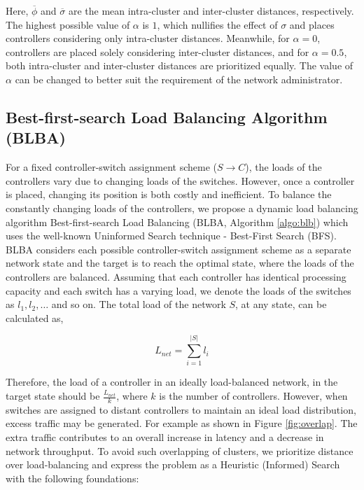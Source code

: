 \documentclass[final,5p,times]{cas-dc}
\begin{document}
	Here, $\overline{\phi}$ and $\overline{\sigma}$ are the  mean intra-cluster and inter-cluster distances, respectively. The highest possible value of $\alpha$ is $1$, which nullifies the effect of $\sigma$ and places controllers considering only intra-cluster distances. Meanwhile, for $\alpha = 0$, controllers are placed solely considering inter-cluster distances, and for $\alpha=0.5$, both intra-cluster and inter-cluster distances are prioritized equally. The value of $\alpha$ can be changed to better suit the requirement of the network administrator.
	
	\subsection{Best-first-search Load Balancing Algorithm (BLBA)} \label{blb}
	
	For a fixed controller-switch assignment scheme ($S\rightarrow C$), the loads of the controllers vary due to changing loads of the switches. However, once a controller is placed, changing its position is both costly and inefficient. To balance the constantly changing loads of the controllers, we propose a dynamic load balancing algorithm Best-first-search Load Balancing (BLBA, Algorithm \ref{algo:blb}) which uses the well-known Uninformed Search technique - Best-First Search (BFS). BLBA considers each possible controller-switch assignment scheme as a separate network state and the target is to reach the optimal state, where the loads of the controllers are balanced. Assuming that each controller has identical processing capacity and each switch has a varying load, we denote the loads of the switches as $l_1, l_2, \dots$ and so on. The total load of the network $S$, at any state, can be calculated as,
	
	\begin{equation}
	L_{net}=\sum_{i=1}^{|S|}l_i
	\end{equation}
	
	Therefore, the load of a controller in an ideally load-balanced network, in the target state should be $\frac{L_{net}}{k}$, where $k$ is the number of controllers. However, when switches are assigned to distant controllers to maintain an ideal load distribution, excess traffic may be generated. For example as shown in Figure \ref{fig:overlap}. The extra traffic contributes to an overall increase in latency and a decrease in network throughput. To avoid such overlapping of clusters, we prioritize distance over load-balancing and express the problem as a Heuristic (Informed) Search with the following foundations:
	
\end{document}
